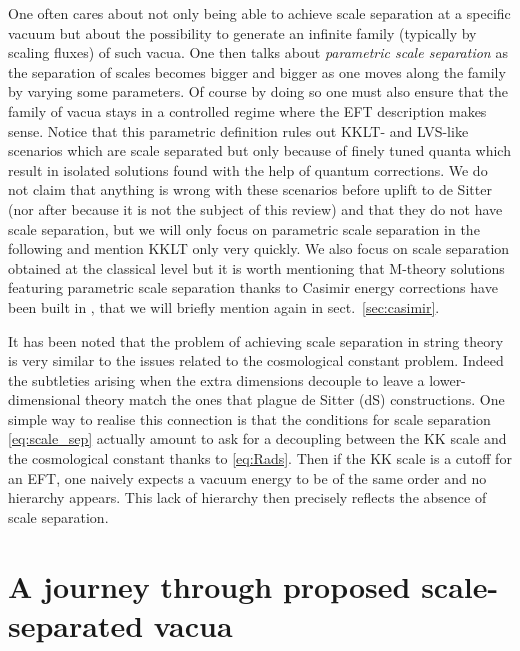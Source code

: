 \documentclass[11pt, a4paper]{article}
\begin{document}
One often cares about not only being able to achieve scale separation at a specific vacuum but about the possibility to generate an infinite family (typically by scaling fluxes) of such vacua. One then talks about \emph{parametric scale separation} as the separation of scales becomes bigger and bigger as one moves along the family by varying some parameters. Of course by doing so one must also ensure that the family of vacua stays in a controlled regime where the EFT description makes sense. Notice that this parametric definition rules out KKLT- \cite{Kachru:2003aw} and LVS-like \cite{Balasubramanian:2005zx} scenarios which are scale separated but only because of finely tuned quanta which result in isolated solutions found with the help of quantum corrections. We do not claim that anything is wrong with these scenarios before uplift to de Sitter (nor after because it is not the subject of this review) and that they do not have scale separation, but we will only focus on parametric scale separation in the following and mention KKLT only very quickly. We also focus on scale separation obtained at the classical level but it is worth mentioning that M-theory solutions featuring parametric scale separation thanks to Casimir energy corrections have been built in \cite{Luca:2022inb}, that we will briefly mention again in sect.~\ref{sec:casimir}.

It has been noted \cite{talkVR,VanRiet:2023pnx,Danielsson:2018ztv,talkmiguel} that the problem of achieving scale separation in string theory is very similar to the issues related to the cosmological constant problem. Indeed the subtleties arising when the extra dimensions decouple to leave a lower-dimensional theory match the ones that plague de Sitter (dS) constructions. One simple way to realise this connection is that the conditions for scale separation \eqref{eq:scale_sep} actually amount to ask for a decoupling between the KK scale and the cosmological constant thanks to \eqref{eq:Rads}. Then if the KK scale is a cutoff for an EFT, one naively expects a vacuum energy to be of the same order and no hierarchy appears. This lack of hierarchy then precisely reflects the absence of scale separation.

\section{A journey through proposed scale-separated vacua}
\label{sec:journey}
\end{document}
